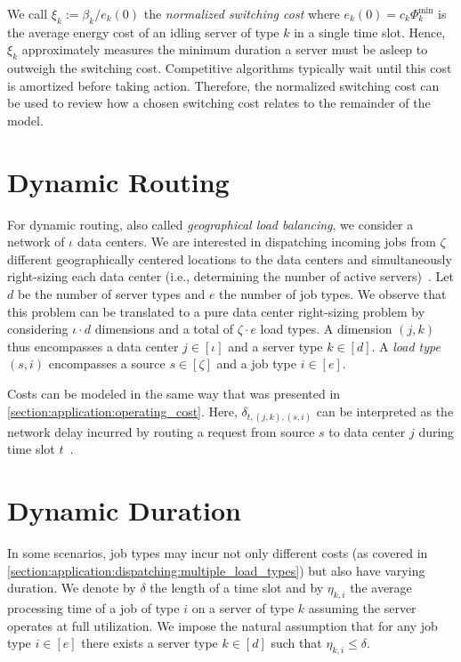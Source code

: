 We call $\xi_k := \beta_k / e_k(0)$ the \emph{normalized switching cost} where $e_k(0) = c_k \Phi_k^{\text{min}}$ is the average energy cost of an idling server of type $k$ in a single time slot. Hence, $\xi_k$ approximately measures the minimum duration a server must be asleep to outweigh the switching cost. Competitive algorithms typically wait until this cost is amortized before taking action. Therefore, the normalized switching cost can be used to review how a chosen switching cost relates to the remainder of the model.

\section{Dynamic Routing}\label{section:application:dynamic_routing}

For dynamic routing, also called \emph{geographical load balancing}, we consider a network of $\iota$ data centers. We are interested in dispatching incoming jobs from $\zeta$ different geographically centered locations to the data centers and simultaneously right-sizing each data center (i.e., determining the number of active servers)~\cite{Lin2012}. Let $d$ be the number of server types and $e$ the number of job types. We observe that this problem can be translated to a pure data center right-sizing problem by considering $\iota \cdot d$ dimensions and a total of $\zeta \cdot e$ load types. A dimension $(j,k)$ thus encompasses a data center $j \in [\iota]$ and a server type $k \in [d]$. A \emph{load type} $(s,i)$ encompasses a source $s \in [\zeta]$ and a job type $i \in [e]$.

Costs can be modeled in the same way that was presented in \cref{section:application:operating_cost}. Here, $\delta_{t,(j,k),(s,i)}$ can be interpreted as the network delay incurred by routing a request from source $s$ to data center $j$ during time slot $t$~\cite{Lin2012}.

\section{Dynamic Duration}\label{section:application:dynamic_duration}

In some scenarios, job types may incur not only different costs (as covered in \cref{section:application:dispatching:multiple_load_types}) but also have varying duration. We denote by $\delta$ the length of a time slot and by $\eta_{k,i}$ the average processing time of a job of type $i$ on a server of type $k$ assuming the server operates at full utilization. We impose the natural assumption that for any job type $i \in [e]$ there exists a server type $k \in [d]$ such that $\eta_{k,i} \leq \delta$.


